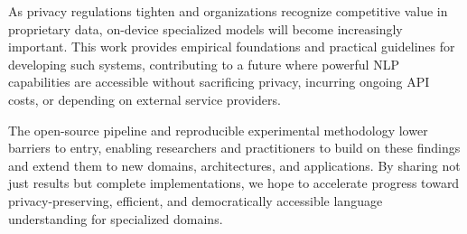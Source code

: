 As privacy regulations tighten and organizations recognize competitive value in proprietary data, on-device specialized models will become increasingly important. This work provides empirical foundations and practical guidelines for developing such systems, contributing to a future where powerful NLP capabilities are accessible without sacrificing privacy, incurring ongoing API costs, or depending on external service providers.

The open-source pipeline and reproducible experimental methodology lower barriers to entry, enabling researchers and practitioners to build on these findings and extend them to new domains, architectures, and applications. By sharing not just results but complete implementations, we hope to accelerate progress toward privacy-preserving, efficient, and democratically accessible language understanding for specialized domains.
